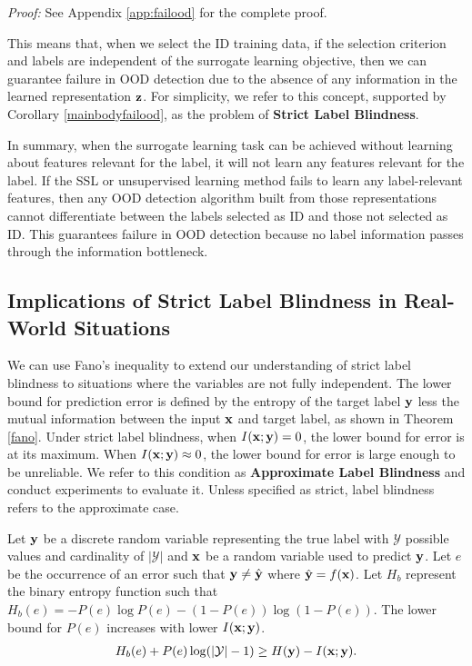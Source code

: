 \textit{Proof:} See Appendix \ref{app:failood} for the complete proof.

This means that, when we select the ID training data, if the selection criterion and labels are independent of the surrogate learning objective, then we can guarantee failure in OOD detection due to the absence of any information in the learned representation ${\mathbf{z}}$. For simplicity, we refer to this concept, supported by Corollary \ref{mainbodyfailood}, as the problem of \textbf{Strict Label Blindness}.

In summary, when the surrogate learning task can be achieved without learning about features relevant for the label, it will not learn any features relevant for the label. If the SSL or unsupervised learning method fails to learn any label-relevant features, then any OOD detection algorithm built from those representations cannot differentiate between the labels selected as ID and those not selected as ID. This guarantees failure in OOD detection because no label information passes through the information bottleneck.

\subsection{Implications of Strict Label Blindness in Real-World Situations}

We can use Fano's inequality to extend our understanding of strict label blindness to situations where the variables are not fully independent. The lower bound for prediction error is defined by the entropy of the target label ${\mathbf{y}}$ less the mutual information between the input ${\mathbf{x}}$ and target label, as shown in Theorem \ref{fano}. Under strict label blindness, when $I({\mathbf{x}};{\mathbf{y}}) = 0$, the lower bound for error is at its maximum. When $I({\mathbf{x}};{\mathbf{y}}) \approx 0$, the lower bound for error is large enough to be unreliable. We refer to this condition as \textbf{Approximate Label Blindness} and conduct experiments to evaluate it. Unless specified as strict, label blindness refers to the approximate case.

\begin{theorem}
Let ${\mathbf{y}}$ be a discrete random variable representing the true label with $\mathcal{Y}$ possible values and cardinality of $|\mathcal{Y}|$ and ${\mathbf{x}}$ be a random variable used to predict ${\mathbf{y}}$. Let $e$ be the occurrence of an error such that ${\mathbf{y}} \neq \hat{{\mathbf{y}}}$ where $\hat{{\mathbf{y}}} = f({\mathbf{x}})$. Let $H_b$ represent the binary entropy function such that $H_b(e)=-P(e) \log P(e)-(1-P(e)) \log (1-P(e))$. The lower bound for $P(e)$ increases with lower $I({\mathbf{x}};{\mathbf{y}})$.
\begin{align} H_b(e) + P(e) \log(| \mathcal{Y} |-1) \geq H({\mathbf{y}}) - I({\mathbf{x}}; {\mathbf{y}}). \end{align}
\label{fano}
\end{theorem}

